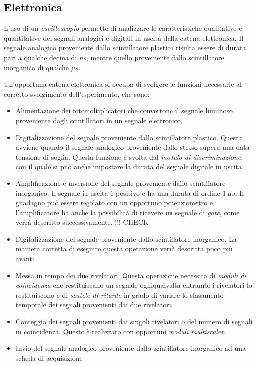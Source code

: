 \documentclass[5pt]{article}
\begin{document}
\subsection{Elettronica}

L'uso di un \textit{oscilloscopio} permette di analizzare le caratteristiche qualitative e quantitative dei segnali analogici e digitali in uscita dalla catena elettronica. Il segnale analogico proveniente dallo scintillatore plastico risulta essere di durata pari a qualche decina di $ns$, mentre quello proveniente dallo scintillatore inorganico di qualche $\mu s$. 

Un'opportuna catena elettronica si occupa di svolgere le funzioni necessarie al corretto svolgimento dell'esperimento, che sono: \\

\begin{itemize}
\item Alimentazione dei fotomoltiplicatori che convertono il segnale luminoso proveniente dagli scintillatori in un segnale elettronico.
\item Digitalizzazione del segnale proveniente dallo scintillatore plastico. Questa avviene
quando il segnale analogico proveniente dallo stesso supera una data tensione di soglia. Questa funzione è svolta dal \textit{modulo di discriminazione}, con il quale si può anche impostare la durata del segnale digitale in uscita.
\item Amplificazione e inversione del segnale proveniente dallo scintillatore inorganico. Il segnale in uscita è positivo e ha una durata di ordine $1 \ \mu s$. Il guadagno può essere regolato con un opportuno potenziometro e l'amplificatore ha anche la possibilità di ricevere un segnale di \textit{gate}, come verrà descritto successivamente. !!! CHECK
\item Digitalizzazione del segnale proveniente dallo scintillatore inorganico. La maniera corretta di eseguire questa operazione verrà descritta poco più avanti.
\item Messa in tempo dei due rivelatori. Questa operazione necessita di \textit{moduli di coincidenza} che restituiscano un segnale ogniqualvolta entrambi i rivelatori lo restituiscono e di \textit{scatole di ritardo} in grado di variare lo sfasamento temporale dei segnali provenienti dai due rivelatori.
\item Conteggio dei segnali provenienti dai singoli rivelatori o del numero di segnali in coincidenza. Questo è realizzato con opportuni \textit{moduli multiscaler}.
\item Invio del segnale analogico proveniente dallo scintillatore inorganico ad una scheda di acquisizione
\end{itemize}
\end{document}
